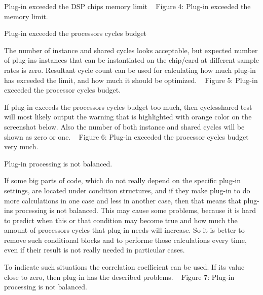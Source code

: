 \begin{DoxyEnumerate}
\item Plug-\/in exceeded the D\+S\+P chip\textquotesingle{}s memory limit ~\newline
  Figure 4\+: Plug-\/in exceeded the memory limit.  
\item Plug-\/in exceeded the processors cycles budget 
\begin{DoxyItemize}
\item The number of instance and shared cycles looks acceptable, but expected number of plug-\/in\textquotesingle{}s instances that can be instantiated on the chip/card at different sample rates is zero. Resultant cycle count can be used for calculating how much plug-\/in has exceeded the limit, and how much it should be optimized. ~\newline
  Figure 5\+: Plug-\/in exceeded the processor cycles budget.  
\item If plug-\/in exceeds the processor\textquotesingle{}s cycles budget too much, then cyclesshared test will most likely output the warning that is highlighted with orange color on the screenshot below. Also the number of both instance and shared cycles will be shown as zero or one. ~\newline
  Figure 6\+: Plug-\/in exceeded the processor cycles budget very much.  
\end{DoxyItemize}
\item Plug-\/in processing is not balanced.

 If some big parts of code, which do not really depend on the specific plug-\/in settings, are located under condition structures, and if they make plug-\/in to do more calculations in one case and less in another case, then that means that plug-\/in\textquotesingle{}s processing is not balanced. This may cause some problems, because it is hard to predict when this or that condition may become true and how much the amount of processor\textquotesingle{}s cycles that plug-\/in needs will increase. So it is better to remove such conditional blocks and to performe those calculations every time, even if their result is not really needed in particular cases.

 To indicate such situations the correlation coefficient can be used. If its value close to zero, then plug-\/in has the described problems. ~\newline
  Figure 7\+: Plug-\/in processing is not balanced.  
\end{DoxyEnumerate}

